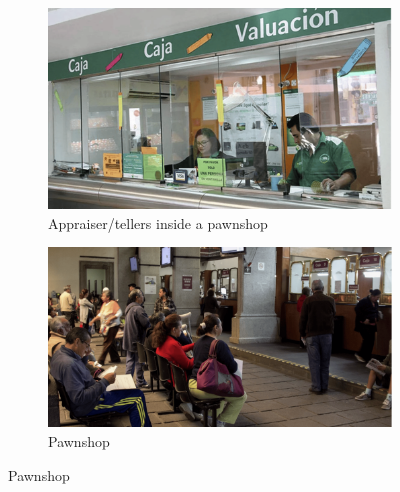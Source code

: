\begin{figure}[H]
     \caption{Some Pawnshops}
    \label{PawnshopPicture}
    \begin{center}
    \begin{subfigure}{0.405\textwidth}
    \caption{Appraiser/tellers inside a pawnshop}
        \centering
        \includegraphics[width=\textwidth]{Figuras/empenio9_.png}
    \end{subfigure}
        \begin{subfigure}{0.45\textwidth}
    \caption{Pawnshop}
        \centering
        \includegraphics[width=\textwidth]{Figuras/empenio11_.png}
    \end{subfigure}
    
        \vspace{3ex}


\end{center}
\end{figure}
